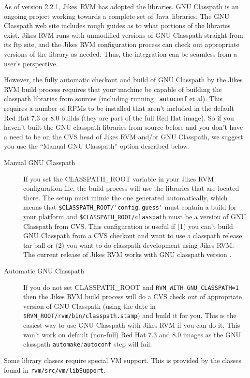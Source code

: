  As of version 2.2.1, Jikes\JikesTMFootnote\ RVM has adopted the
 libraries.  GNU
Classpath is an ongoing project working towards a complete set of
Java\JavaTMFootnote\ libraries.  The GNU Classpath web site includes
rough guides as to what portions of the libraries exist.  Jikes RVM
runs with unmodified versions of GNU Classpath straight from its ftp
site, and the Jikes RVM configuration process can check out
appropriate versions of the library as needed.  Thus, the integration
can be seamless from a user's perspective.

However, the fully automatic checkout and build of GNU Classpath by
the Jikes RVM build process requires that your machine be capable of
building the classpath libraries from sources (including running {\tt
autoconf} et al).  This requires a number of RPMs to be installed that
aren't included in the default Red Hat 7.3 or 8.0 builds (they are
part of the full Red Hat image).  So if you haven't built the GNU
classpath libraries from source before and you don't have a need to be
on the CVS head of Jikes RVM and/or GNU Classpath, we suggest you use
the ``Manual GNU Classpath'' option described below.

\begin{description}
\item[Manual GNU Classpath] If you set the CLASSPATH\_ROOT variable in
your Jikes RVM configuration file, the build process will use the
libraries that are located there.  The setup must mimic the one
generated automatically, which means that
{\tt \$CLASSPATH\_ROOT/`config.guess`} must contain a build for your platform
and {\tt \$CLASSPATH\_ROOT/classpath} must be a version of GNU Classpath from
CVS.  This configuration is useful if (1) you can't build GNU
Classpath from a CVS checkout and want to use a classpath release tar
ball or (2) you want to do classpath development using Jikes RVM. The
current release of Jikes RVM works with GNU classpath version \classpathversion.

\item[Automatic GNU Classpath] If you do not set CLASSPATH\_ROOT and 
{\tt RVM\_WITH\_GNU\_CLASSPATH=1} then the Jikes RVM build process will do a
CVS check out of appropriate version of GNU Classpath (using the date
in {\tt \$RVM\_ROOT/rvm/bin/classpath.stamp}) and build it for you.  This is
the easiest way to use GNU Classpath with Jikes RVM if you can do it.
This won't work on default (non-full) Red Hat 7.3 and 8.0 images
as the GNU classpath {\tt automake}/{\tt autoconf} step will fail.

\end{description}

Some library classes require special VM support.  This is provided by
the classes found in {\tt rvm/src/vm/libSupport}. 

\JavaTMFooter
\JikesTMFooter
